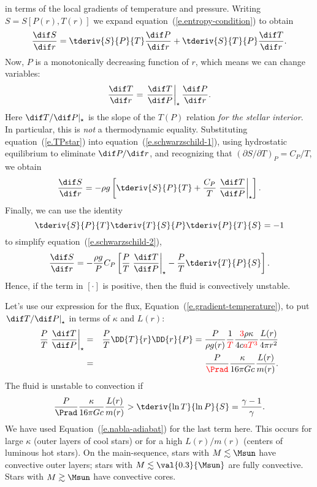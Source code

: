  in terms of the local gradients of temperature and pressure. Writing $S = S[P(r),T(r)]$ we expand equation~(\ref{e.entropy-condition}) to obtain
\begin{equation}\label{e.schwarzschild-1}
\frac{\dif S}{\dif r} = \tderiv{S}{P}{T} \frac{\dif P}{\dif r} + \tderiv{S}{T}{P}\frac{\dif T}{\dif r} .
\end{equation}
Now, $P$ is a monotonically decreasing function of $r$, which means we can change variables:
\begin{equation}\label{e.TPstar}
\frac{\dif T}{\dif r} = \TPstar \frac{\dif P}{\dif r} .
\end{equation}
Here $\dif T/\dif P|_{\star}$ is the slope of the $T(P)$ relation \emph{for the stellar interior}.  In particular, this is \emph{not} a thermodynamic equality. Substituting equation~(\ref{e.TPstar}) into equation~(\ref{e.schwarzschild-1}), using hydrostatic equilibrium to eliminate $\dif P/\dif r$, and recognizing that $(\partial S/\partial T)_{P} = C_{P}/T$, we obtain
\begin{equation}\label{e.schwarzschild-2}
\frac{\dif S}{\dif r} =  -\rho g\left[\tderiv{S}{P}{T} + \frac{C_{P}}{T} \TPstar \right].
\end{equation}
Finally, we can use the identity
\begin{equation}
\tderiv{S}{P}{T}\tderiv{T}{S}{P}\tderiv{P}{T}{S} = -1
\end{equation}
to simplify equation~(\ref{e.schwarzschild-2}),
\begin{equation}
\frac{\dif S}{\dif r} = -\frac{\rho g}{P}C_{P}\left[\frac{P}{T}\TPstar - \frac{P}{T}\tderiv{T}{P}{S}\right].
 \label{e.schwarzschild}
\end{equation}
Hence, if the term in $\left[\cdot\right]$ is positive, then the fluid is convectively unstable.

Let's use our expression for the flux, Equation~(\ref{e.gradient-temperature}), to put $\left.\dif T/\dif P\right|_\star$ in terms of $\kappa$ and $L(r)$:
\begin{eqnarray}
    \frac{P}{T}\TPstar &=& \frac{P}{T}\DD{T}{r}\DD{r}{P} = \frac{P}{\rho g(r)}\frac{1}{\color{red}T}\frac{{\color{red}3}\rho\kappa}{4c {\color{red}a T^3}}\frac{L(r)}{4\pi r^2} \nonumber\\
    &=& \frac{P}{\color{red}\Prad}\frac{\kappa}{16\pi Gc} \frac{L(r)}{m(r)}.
\end{eqnarray}
The fluid is unstable to convection if
\begin{equation}
    \frac{P}{\Prad}\frac{\kappa}{16\pi Gc}\frac{L(r)}{m(r)} > \tderiv{\ln T}{\ln P}{S}  = \frac{\gamma -1}{\gamma}.
\end{equation}
We have used Equation~(\ref{e.nabla-adiabat}) for the last term here.
This occurs for large $\kappa$ (outer layers of cool stars) or for a high $L(r)/m(r)$ (centers of luminous hot stars).  On the main-sequence, stars with $M \lesssim \Msun$ have convective outer layers; stars with $M \lesssim \val{0.3}{\Msun}$ are fully convective. Stars with $M\gtrsim\Msun$ have convective cores.